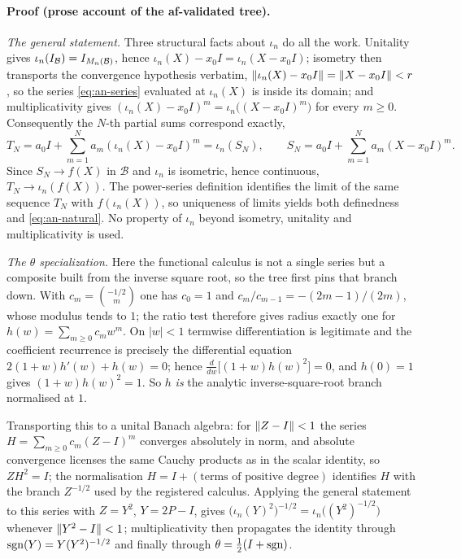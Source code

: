 \paragraph{Proof (prose account of the af-validated tree).}
\emph{The general statement.} Three structural facts about $\iota_n$ do all the work.
Unitality gives $\iota_n(I_{\mathcal B})=I_{M_{n}(\mathcal B)}$, hence
$\iota_n(X)-x_0I=\iota_n(X-x_0I)$; isometry then transports the convergence hypothesis
verbatim, $\lVert \iota_n(X)-x_0I\rVert=\lVert X-x_0I\rVert<r$, so the series
\eqref{eq:an-series} evaluated at $\iota_n(X)$ is inside its domain; and
multiplicativity gives $(\iota_n(X)-x_0I)^{m}=\iota_n\bigl((X-x_0I)^{m}\bigr)$ for every
$m\ge0$. Consequently the $N$-th partial sums correspond exactly,
\[
  T_N=a_0I+\sum_{m=1}^{N}a_m(\iota_n(X)-x_0I)^{m}=\iota_n(S_N),
  \qquad S_N=a_0I+\sum_{m=1}^{N}a_m(X-x_0I)^{m}.
\]
Since $S_N\to f(X)$ in $\mathcal B$ and $\iota_n$ is isometric, hence continuous,
$T_N\to\iota_n(f(X))$. The power-series definition identifies the limit of the same
sequence $T_N$ with $f(\iota_n(X))$, so uniqueness of limits yields both definedness and
\eqref{eq:an-natural}. No property of $\iota_n$ beyond isometry, unitality and multiplicativity is used.

\emph{The $\theta$ specialization.} Here the functional calculus is not a single series
but a composite built from the inverse square root, so the tree first pins that branch
down. With $c_m=\binom{-1/2}{m}$ one has $c_0=1$ and $c_m/c_{m-1}=-(2m-1)/(2m)$, whose
modulus tends to $1$; the ratio test therefore gives radius exactly one for
$h(w)=\sum_{m\ge0}c_mw^{m}$. On $|w|<1$ termwise differentiation is legitimate and the
coefficient recurrence is precisely the differential equation
$2(1+w)h'(w)+h(w)=0$; hence $\frac{d}{dw}\bigl[(1+w)h(w)^2\bigr]=0$, and $h(0)=1$ gives
$(1+w)h(w)^2=1$. So $h$ \emph{is} the analytic inverse-square-root branch normalised at
$1$.

Transporting this to a unital Banach algebra: for $\lVert Z-I\rVert<1$ the series
$H=\sum_{m\ge0}c_m(Z-I)^{m}$ converges absolutely in norm, and absolute convergence
licenses the same Cauchy products as in the scalar identity, so $ZH^2=I$; the
normalisation $H=I+(\text{terms of positive degree})$ identifies $H$ with the branch
$Z^{-1/2}$ used by the registered calculus. Applying the general statement to this series
with $Z=Y^2$, $Y=2P-I$, gives
$\bigl(\iota_n(Y)^2\bigr)^{-1/2}=\iota_n\bigl((Y^2)^{-1/2}\bigr)$ whenever
$\lVert Y^2-I\rVert<1$; multiplicativity then propagates the identity through
$\operatorname{sgn}(Y)=Y(Y^2)^{-1/2}$ and finally through $\theta=\tfrac12(I+\operatorname{sgn})$.

